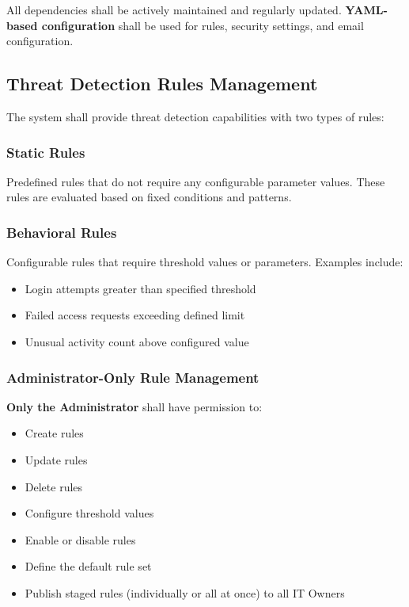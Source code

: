\documentclass[12pt,a4paper]{article}
\begin{document}
All dependencies shall be actively maintained and regularly updated. \textbf{YAML-based configuration} shall be used for rules, security settings, and email configuration.

\subsection{Threat Detection Rules Management} \label{sec:rules-management}

The system shall provide threat detection capabilities with two types of rules:

\subsubsection{Static Rules}
Predefined rules that do not require any configurable parameter values. These rules are evaluated based on fixed conditions and patterns.

\subsubsection{Behavioral Rules}
Configurable rules that require threshold values or parameters. Examples include:
\begin{itemize}
    \item Login attempts greater than specified threshold
    \item Failed access requests exceeding defined limit
    \item Unusual activity count above configured value
\end{itemize}

\subsubsection{Administrator-Only Rule Management}
\textbf{Only the Administrator} shall have permission to:
\begin{itemize}
    \item Create rules
    \item Update rules
    \item Delete rules
    \item Configure threshold values
    \item Enable or disable rules
    \item Define the default rule set
    \item Publish staged rules (individually or all at once) to all IT Owners
\end{itemize}
\end{document}
